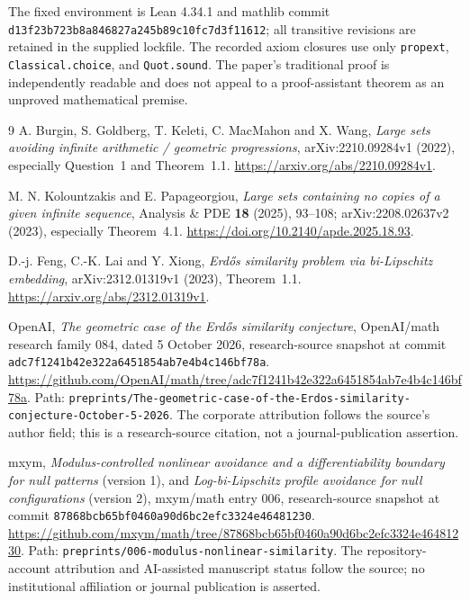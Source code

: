 \documentclass[11pt]{article}
\theoremstyle{definition}
\theoremstyle{remark}
\newcommand{\code}[1]{{\small\nolinkurl{#1}}}
\begin{document}
The fixed environment is Lean 4.34.1 and mathlib commit
\nolinkurl{d13f23b723b8a846827a245b89c10fc7d3f11612}; all transitive revisions are
retained in the supplied lockfile. The recorded axiom closures use only
\code{propext}, \code{Classical.choice}, and \code{Quot.sound}. The paper's
traditional proof is independently readable and does not appeal to a
proof-assistant theorem as an unproved mathematical premise.



\begin{thebibliography}{9}
A. Burgin, S. Goldberg, T. Keleti, C. MacMahon and X. Wang,
\emph{Large sets avoiding infinite arithmetic / geometric progressions},
arXiv:2210.09284v1 (2022), especially Question~1 and Theorem~1.1.
\url{https://arxiv.org/abs/2210.09284v1}.

M. N. Kolountzakis and E. Papageorgiou,
\emph{Large sets containing no copies of a given infinite sequence},
Analysis \& PDE \textbf{18} (2025), 93--108;
arXiv:2208.02637v2 (2023), especially Theorem~4.1.
\url{https://doi.org/10.2140/apde.2025.18.93}.

D.-j. Feng, C.-K. Lai and Y. Xiong,
\emph{Erd\H{o}s similarity problem via bi-Lipschitz embedding},
arXiv:2312.01319v1 (2023), Theorem~1.1.
\url{https://arxiv.org/abs/2312.01319v1}.

OpenAI, \emph{The geometric case of the Erd\H{o}s similarity conjecture},
OpenAI/math research family 084, dated 5 October 2026,
research-source snapshot at commit
\texttt{adc7f1241b42e322a6451854ab7e4b4c146bf78a}.
\url{https://github.com/OpenAI/math/tree/adc7f1241b42e322a6451854ab7e4b4c146bf78a}.
Path: \nolinkurl{preprints/The-geometric-case-of-the-Erdos-similarity-conjecture-October-5-2026}.
The corporate attribution follows the source's author field; this is a
research-source citation, not a journal-publication assertion.

mxym, \emph{Modulus-controlled nonlinear avoidance and a differentiability
boundary for null patterns} (version 1), and
\emph{Log-bi-Lipschitz profile avoidance for null configurations} (version 2),
mxym/math entry 006, research-source snapshot at
commit \texttt{87868bcb65bf0460a90d6bc2efc3324e46481230}.
\url{https://github.com/mxym/math/tree/87868bcb65bf0460a90d6bc2efc3324e46481230}.
Path: \nolinkurl{preprints/006-modulus-nonlinear-similarity}.
The repository-account attribution and AI-assisted manuscript status follow
the source; no institutional affiliation or journal publication is asserted.
\end{thebibliography}
\end{document}

